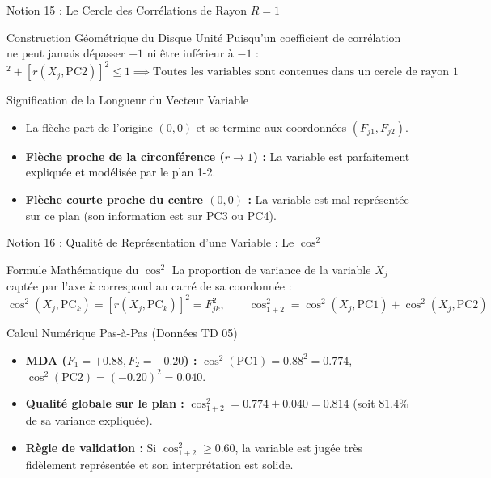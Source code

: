 \documentclass[aspectratio=169,10pt]{beamer}
\begin{document}
\begin{frame}{Notion 15 : Le Cercle des Corrélations de Rayon $R = 1$}
  \begin{conceptbox}{Construction Géométrique du Disque Unité}
    \footnotesize
    Puisqu'un coefficient de corrélation ne peut jamais dépasser $+1$ ni être inférieur à $-1$ :
    \begin{equation*}
      [r(X_j, \text{PC1})]^2 + [r(X_j, \text{PC2})]^2 \le 1 \implies \text{Toutes les variables sont contenues dans un cercle de rayon } 1
    \end{equation*}
  \end{conceptbox}
  \vspace{1mm}
  \begin{biobox}{Signification de la Longueur du Vecteur Variable}
    \footnotesize
    \begin{itemize}
      \item La flèche part de l'origine $(0,0)$ et se termine aux coordonnées $(F_{j1}, F_{j2})$.
      \item \textbf{Flèche proche de la circonférence ($r \to 1$) :} La variable est parfaitement expliquée et modélisée par le plan 1-2.
      \item \textbf{Flèche courte proche du centre $(0,0)$ :} La variable est mal représentée sur ce plan (son information est sur PC3 ou PC4).
    \end{itemize}
  \end{biobox}
\end{frame}

\begin{frame}{Notion 16 : Qualité de Représentation d'une Variable : Le $\cos^2$}
  \begin{conceptbox}{Formule Mathématique du $\cos^2$}
    \footnotesize
    La proportion de variance de la variable $X_j$ captée par l'axe $k$ correspond au carré de sa coordonnée :
    \begin{equation*}
      \cos^2(X_j, \text{PC}_k) = [r(X_j, \text{PC}_k)]^2 = F_{jk}^2, \qquad \cos^2_{1+2} = \cos^2(X_j, \text{PC1}) + \cos^2(X_j, \text{PC2})
    \end{equation*}
  \end{conceptbox}
  \vspace{1mm}
  \begin{biobox}{Calcul Numérique Pas-à-Pas (Données TD 05)}
    \footnotesize
    \begin{itemize}
      \item \textbf{MDA ($F_1 = +0.88, F_2 = -0.20$) :} $\cos^2(\text{PC1}) = 0.88^2 = \mathbf{0.774}$, $\cos^2(\text{PC2}) = (-0.20)^2 = \mathbf{0.040}$.
      \item \textbf{Qualité globale sur le plan :} $\cos^2_{1+2} = 0.774 + 0.040 = \mathbf{0.814}$ (soit $81.4\%$ de sa variance expliquée).
      \item \textbf{Règle de validation :} Si $\cos^2_{1+2} \ge 0.60$, la variable est jugée très fidèlement représentée et son interprétation est solide.
    \end{itemize}
  \end{biobox}
\end{frame}
\end{document}
